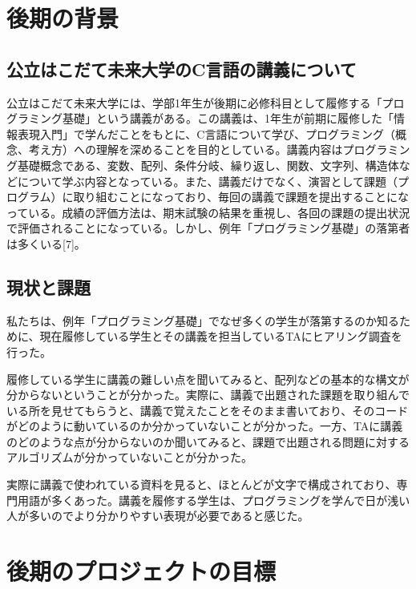\documentclass[openany,11pt,papersize]{jsbook}
\begin{document}



\chapter{後期の背景}

\section{公立はこだて未来大学のC言語の講義について}
\par 公立はこだて未来大学には、学部1年生が後期に必修科目として履修する「プログラミング基礎」という講義がある。この講義は、1年生が前期に履修した「情報表現入門」で学んだことをもとに、C言語について学び、プログラミング（概念、考え方）への理解を深めることを目的としている。講義内容はプログラミング基礎概念である、変数、配列、条件分岐、繰り返し、関数、文字列、構造体などについて学ぶ内容となっている。また、講義だけでなく、演習として課題（プログラム）に取り組むことになっており、毎回の講義で課題を提出することになっている。成績の評価方法は、期末試験の結果を重視し、各回の課題の提出状況で評価されることになっている。しかし、例年「プログラミング基礎」の落第者は多くいる[7]。

\section{現状と課題}
\par 私たちは、例年「プログラミング基礎」でなぜ多くの学生が落第するのか知るために、現在履修している学生とその講義を担当しているTAにヒアリング調査を行った。
\par 履修している学生に講義の難しい点を聞いてみると、配列などの基本的な構文が分からないということが分かった。実際に、講義で出題された課題を取り組んでいる所を見せてもらうと、講義で覚えたことをそのまま書いており、そのコードがどのように動いているのか分かっていないことが分かった。一方、TAに講義のどのような点が分からないのか聞いてみると、課題で出題される問題に対するアルゴリズムが分かっていないことが分かった。
\par 実際に講義で使われている資料を見ると、ほとんどが文字で構成されており、専門用語が多くあった。講義を履修する学生は、プログラミングを学んで日が浅い人が多いのでより分かりやすい表現が必要であると感じた。



\chapter{後期のプロジェクトの目標}
\end{document}

